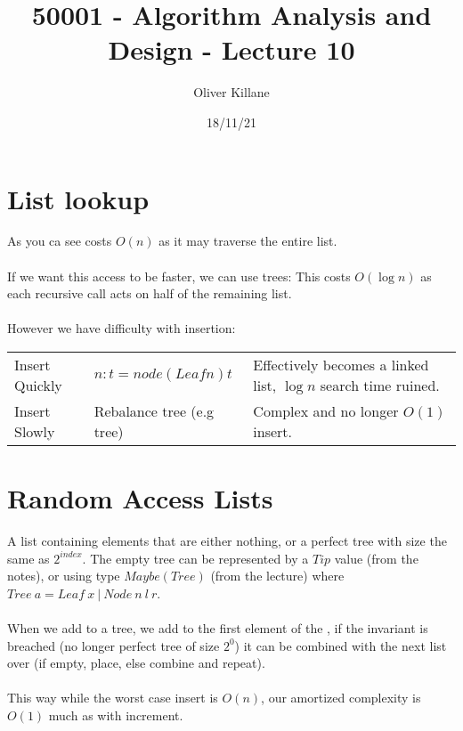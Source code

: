 \documentclass{report}
\title{50001 - Algorithm Analysis and Design - Lecture 10}
\author{Oliver Killane}
\date{18/11/21}
\begin{document}
\maketitle
{}

\section*{List lookup}
As you ca  see \fun{!!} costs $O(n)$ as it may traverse the entire list.
\\
\\ If we want this access to be faster, we can use trees:
This costs $O(\log n)$ as each recursive call acts on half of the remaining list.
\\
\\ However we have difficulty with insertion:
\begin{center}
	\begin{tabular}{l l l}
		Insert Quickly & $n : t = node (Leaf n) t$               & Effectively becomes a linked list, $\log n$ search time ruined. \\
		Insert Slowly  & Rebalance tree (e.g \keyword{AVL} tree) & Complex and no longer $O(1)$ insert.                            \\
	\end{tabular}
\end{center}

\section*{Random Access Lists}
A list containing elements that are either nothing, or a perfect tree with size the same as $2^{index}$.
The empty tree can be represented by a $Tip$ value (from the notes), or using type $Maybe(Tree)$ (from the lecture) where $Tree \ a = Leaf \ x \ | \ Node \ n \ l \ r$.
\\
\\ When we add to a tree, we add to the first element of the , if the invariant is breached (no longer perfect tree of size $2^0$) it can be combined with the next list over (if empty, place, else combine and repeat).
\\
\\ This way while the worst case insert is $O(n)$, our amortized complexity is $O(1)$ much as with increment.
\end{document}
